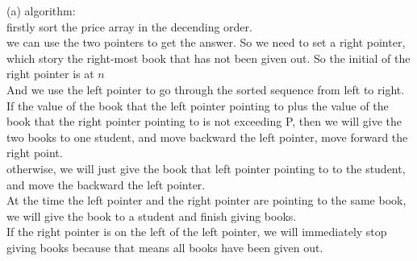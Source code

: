 \begin{solution}
(a) algorithm:\\
firstly sort the price array in the decending order.\\
we can use the two pointers to get the answer. So we need to set a right pointer,
which story the right-most book that has not been given out. So the initial of the right pointer is at $n$ \\
And we use the left pointer to go through the sorted sequence from left to right.\\
If the value of the book that the left pointer pointing to plus the value of the book that the right pointer pointing to is not exceeding P,
then we will give the two books to one student, and move backward the left pointer, move forward the right point.\\
otherwise, we will just give the book that left pointer pointing to to the student, and move the 
backward the left pointer.\\
At the time the left pointer and the right pointer are pointing to the same book, we will give the book to a student and finish giving books.\\
If the right pointer is on the left of the left pointer, we will immediately stop giving books because that means all books have been given out. 


\end{solution}

